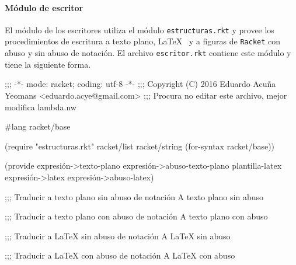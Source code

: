 \documentclass[letterpaper,twoside,openright,11pt]{book}
\begin{document}
\nwenddocs{}\paragraph{Módulo de escritor} El módulo de los escritores utiliza el módulo {\tt{}estructuras.rkt} y provee los procedimientos de escritura a texto plano, \LaTeX~ y a figuras de {\tt{}Racket} con abuso y sin abuso de notación. El archivo {\tt{}escritor.rkt} contiene este módulo y tiene la siguiente forma.

\nwenddocs{}\endmoddef
;;; -*- mode: racket; coding: utf-8 -*-
;;; Copyright (C) 2016 Eduardo Acuña Yeomans <eduardo.acye@gmail.com>
;;; Procura no editar este archivo, mejor modifica lambda.nw

#lang racket/base

(require "estructuras.rkt"
         racket/list
         racket/string
         (for-syntax racket/base))

(provide expresión->texto-plano
         expresión->abuso-texto-plano
         plantilla-latex
         expresión->latex
         expresión->abuso-latex)

;;; Traducir a texto plano sin abuso de notación
\LA{}A texto plano sin abuso~{\nwtagstyle{}}\RA{}

;;; Traducir a texto plano con abuso de notación
\LA{}A texto plano con abuso~{\nwtagstyle{}}\RA{}

;;; Traducir a LaTeX sin abuso de notación
\LA{}A LaTeX sin abuso~{\nwtagstyle{}}\RA{}

;;; Traducir a LaTeX con abuso de notación
\LA{}A LaTeX con abuso~{\nwtagstyle{}}\RA{}
\nwendcode{}\nwdocspar
\end{document}
